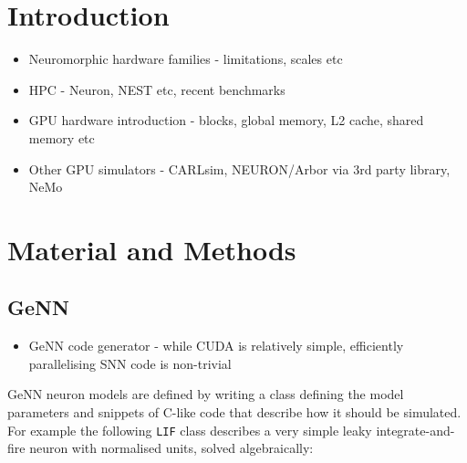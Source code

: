 \documentclass[utf8]{frontiersSCNS} %
\begin{document}
\section{Introduction}

\begin{itemize}
    \item Neuromorphic hardware families - limitations, scales etc
    \item HPC - Neuron, NEST etc, recent benchmarks
    \item GPU hardware introduction - blocks, global memory, L2 cache, shared memory etc
    \item Other GPU simulators - CARLsim, NEURON/Arbor via 3rd party library, NeMo
\end{itemize}

\section{Material and Methods}
\label{sec:method}
\subsection{GeNN}
\begin{itemize}
    \item GeNN code generator - while CUDA is relatively simple, efficiently parallelising SNN code is non-trivial    
\end{itemize}

GeNN neuron models are defined by writing a class defining the model parameters and snippets of C-like code that describe how it should be simulated.
For example the following \lstinline{LIF} class describes a very simple leaky integrate-and-fire neuron with normalised units, solved algebraically:


\end{document}
